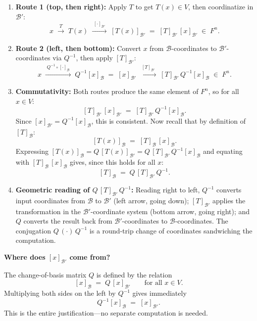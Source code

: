 \documentclass[12pt]{article}
\theoremstyle{remark}
\theoremstyle{definition}
\begin{document}
\begin{enumerate}
    \item \textbf{Route 1 (top, then right):}
    Apply $T$ to get $T(x) \in V$, then coordinatize in $\mathcal{B}'$:
    \[
        x \;\xrightarrow{\;T\;}\; T(x)
          \;\xrightarrow{\;[\cdot]_{\mathcal{B}'}\;}\;
          [T(x)]_{\mathcal{B}'} \;=\; [T]_{\mathcal{B}'}\,[x]_{\mathcal{B}'}
          \;\in\; F^n.
    \]

    \item \textbf{Route 2 (left, then bottom):}
    Convert $x$ from $\mathcal{B}$-coordinates to $\mathcal{B}'$-coordinates via $Q^{-1}$,
    then apply $[T]_{\mathcal{B}'}$:
    \[
        x \;\xrightarrow{\;Q^{-1} \circ [\cdot]_{\mathcal{B}}\;}\;
          Q^{-1}[x]_{\mathcal{B}} \;=\; [x]_{\mathcal{B}'}
          \;\xrightarrow{\;[T]_{\mathcal{B}'}\;}\;
          [T]_{\mathcal{B}'}\,Q^{-1}[x]_{\mathcal{B}}
          \;\in\; F^n.
    \]

    \item \textbf{Commutativity:}
    Both routes produce the same element of $F^n$, so for all $x \in V$:
    \[
        [T]_{\mathcal{B}'}\,[x]_{\mathcal{B}'} \;=\; [T]_{\mathcal{B}'}\,Q^{-1}[x]_{\mathcal{B}}.
    \]
    Since $[x]_{\mathcal{B}'} = Q^{-1}[x]_{\mathcal{B}}$, this is consistent.
    Now recall that by definition of $[T]_{\mathcal{B}}$:
    \[
        [T(x)]_{\mathcal{B}} \;=\; [T]_{\mathcal{B}}\,[x]_{\mathcal{B}}.
    \]
    Expressing $[T(x)]_{\mathcal{B}} = Q\,[T(x)]_{\mathcal{B}'}
    = Q\,[T]_{\mathcal{B}'}\,Q^{-1}[x]_{\mathcal{B}}$
    and equating with $[T]_{\mathcal{B}}\,[x]_{\mathcal{B}}$ gives,
    since this holds for all $x$:
    \[
        \boxed{[T]_{\mathcal{B}} \;=\; Q\,[T]_{\mathcal{B}'}\,Q^{-1}.}
    \]

    \item \textbf{Geometric reading of $Q\,[T]_{\mathcal{B}'}\,Q^{-1}$:}
    Reading right to left, $Q^{-1}$ converts input coordinates from $\mathcal{B}$
    to $\mathcal{B}'$ (left arrow, going down); $[T]_{\mathcal{B}'}$ applies the
    transformation in the $\mathcal{B}'$-coordinate system (bottom arrow, going right);
    and $Q$ converts the result back from $\mathcal{B}'$-coordinates to
    $\mathcal{B}$-coordinates. The conjugation $Q\,(\cdot)\,Q^{-1}$ is a round-trip
    change of coordinates sandwiching the computation.
\end{enumerate}

\noindent\textbf{Where does $[x]_{\mathcal{B}'}$ come from?}

\medskip
The change-of-basis matrix $Q$ is defined by the relation
\[
    [x]_{\mathcal{B}} \;=\; Q\,[x]_{\mathcal{B}'}
    \qquad \text{for all } x \in V.
\]
Multiplying both sides on the left by $Q^{-1}$ gives immediately
\[
    Q^{-1}[x]_{\mathcal{B}} \;=\; [x]_{\mathcal{B}'}.
\]
This is the entire justification---no separate computation is needed.
\end{document}
